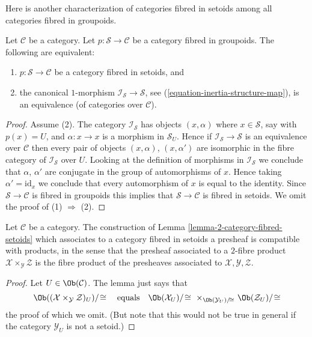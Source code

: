 \noindent
Here is another characterization of categories fibred in setoids
among all categories fibred in groupoids.

\begin{lemma}
\label{lemma-characterize-fibred-setoids-inertia}
Let $\mathcal{C}$ be a category.
Let $p : \mathcal{S} \to \mathcal{C}$ be a category fibred in groupoids.
The following are equivalent:
\begin{enumerate}
\item $p : \mathcal{S} \to \mathcal{C}$ be a category fibred in setoids, and
\item the canonical $1$-morphism $\mathcal{I}_\mathcal{S} \to \mathcal{S}$,
see (\ref{equation-inertia-structure-map}), is an equivalence (of categories
over $\mathcal{C}$).
\end{enumerate}
\end{lemma}

\begin{proof}
Assume (2). The category $\mathcal{I}_\mathcal{S}$ has objects
$(x, \alpha)$ where $x \in \mathcal{S}$, say with $p(x) = U$, and
$\alpha : x \to x$ is a morphism in $\mathcal{S}_U$. Hence if
$\mathcal{I}_\mathcal{S} \to \mathcal{S}$ is an equivalence over $\mathcal{C}$
then every pair of objects $(x, \alpha)$, $(x, \alpha')$ are isomorphic
in the fibre category of $\mathcal{I}_\mathcal{S}$ over $U$.
Looking at the definition of morphisms in $\mathcal{I}_\mathcal{S}$
we conclude that $\alpha$, $\alpha'$ are conjugate in the group
of automorphisms of $x$. Hence taking $\alpha' = \text{id}_x$ we conclude
that every automorphism of $x$ is equal to the identity.
Since $\mathcal{S} \to \mathcal{C}$ is fibred in groupoids this
implies that $\mathcal{S} \to \mathcal{C}$ is fibred in setoids.
We omit the proof of (1) $\Rightarrow$ (2).
\end{proof}

\begin{lemma}
\label{lemma-category-fibred-setoids-presheaves-products}
Let $\mathcal{C}$ be a category.
The construction of
Lemma \ref{lemma-2-category-fibred-setoids}
which associates to a category fibred in setoids a presheaf is
compatible with products, in the sense that the presheaf associated
to a $2$-fibre product $\mathcal{X} \times_\mathcal{Y} \mathcal{Z}$
is the fibre product of the presheaves associated to
$\mathcal{X}, \mathcal{Y}, \mathcal{Z}$.
\end{lemma}

\begin{proof}
Let $U \in \Ob(\mathcal{C})$. The lemma just says that
$$
\Ob((\mathcal{X} \times_\mathcal{Y} \mathcal{Z})_U)/\!\cong
\quad \text{equals} \quad
\Ob(\mathcal{X}_U)/\!\cong
\ \times_{\Ob(\mathcal{Y}_U)/\!\cong}
\ \Ob(\mathcal{Z}_U)/\!\cong
$$
the proof of which we omit. (But note that this would not be true
in general if the category $\mathcal{Y}_U$ is not a setoid.)
\end{proof}










